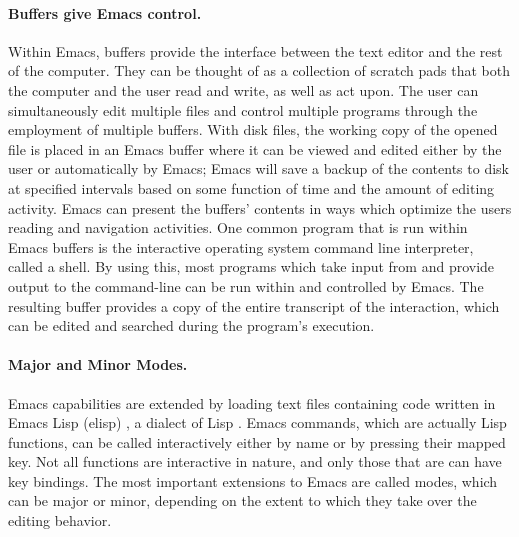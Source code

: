 \documentclass{article}
\begin{document}
\paragraph{Buffers give Emacs control.}
Within Emacs, buffers provide the interface between the text editor
and the rest of the computer.  They can be thought of as a collection
of scratch pads that both the computer and the user read and write, as
well as act upon.  The user can simultaneously edit multiple files and
control multiple programs through the employment of multiple buffers.
With disk files, the working copy of the opened file is placed in an
Emacs buffer where it can be viewed and edited either by the user or
automatically by Emacs; Emacs will save a backup of the contents to disk at
specified intervals based on some function of time and the amount of
editing activity.  Emacs can present the buffers' contents in ways
which optimize the users reading and navigation activities.  One
common program that is run within Emacs buffers is the interactive
operating system command line interpreter, called a shell.  By using
this, most programs which take input from and provide output to the
command-line can be run within and controlled by Emacs.
The resulting buffer provides a copy of the entire transcript of the
interaction, which can be edited and searched during the program's 
execution.

\paragraph{Major and Minor Modes.}
Emacs capabilities are extended by loading text files containing code
written in Emacs Lisp (elisp) \citep{RChassell1999}, a dialect of Lisp
\citep{PGraham:1996}.  Emacs commands, which are actually Lisp
functions, can be called interactively either by name or by pressing
their mapped key.  Not all functions are interactive in nature, and
only those that are can have key bindings.  The most important
extensions to Emacs are called modes, which can be major or minor,
depending on the extent to which they take over the editing behavior.
\end{document}
